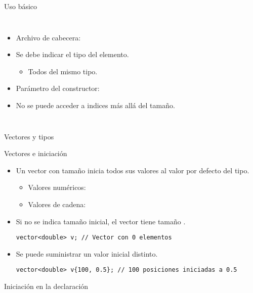 \begin{frame}{Uso básico}
\begin{columns}[t]



\begin{itemize}
  \item Archivo de cabecera:
  \item Se debe indicar el tipo del elemento.
    \begin{itemize}
      \item Todos del mismo tipo.
    \end{itemize}
  \item Parámetro del constructor:
  \item No se puede acceder a indices más allá del tamaño.
\end{itemize}
\end{columns}
\end{frame}

\begin{frame}{Vectores y tipos}

\end{frame}


\begin{frame}[t,fragile]{Vectores e iniciación}
\begin{itemize}
  \item Un vector con tamaño inicia todos sus valores al valor por defecto del tipo.
    \begin{itemize}
      \item Valores numéricos: 
      \item Valores de cadena: 
    \end{itemize}
  \item Si no se indica tamaño inicial, el vector tiene tamaño .
\begin{lstlisting}
vector<double> v; // Vector con 0 elementos
\end{lstlisting}
  \item Se puede suministrar un valor inicial distinto.
\begin{lstlisting}
vector<double> v{100, 0.5}; // 100 posiciones iniciadas a 0.5
\end{lstlisting}
\end{itemize}
\end{frame}

\begin{frame}{Iniciación en la declaración}

\end{frame}

